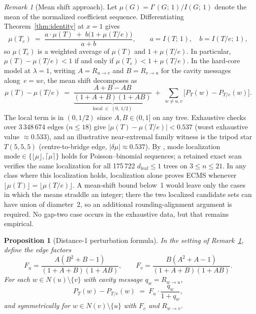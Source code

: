 \documentclass[12pt,oneside]{article}
\newtheorem{proposition}[theorem]{Proposition}
\theoremstyle{remark}
\newtheorem{remark}[theorem]{Remark}
\newcommand{\dleaf}{d_{\mathrm{leaf}}}    %
\begin{document}
\begin{remark}[Mean shift approach]\label{rem:mean-shift}
  Let $\mu(G) = I'(G;\,1)/I(G;\,1)$ denote the mean of the normalized coefficient sequence.
  Differentiating Theorem~\ref{thm:identity} at $x = 1$ gives
  \[
    \mu(T_e) \;=\; \frac{a \cdot \mu(T) \;+\; b\bigl(1 + \mu(T/e)\bigr)}{a + b},
    \qquad a = I(T;\,1),\quad b = I(T/e;\,1),
  \]
  so $\mu(T_e)$ is a weighted average of $\mu(T)$ and $1 + \mu(T/e)$.
  In particular, $\mu(T) - \mu(T/e) < 1$ if and only if $\mu(T_e) < 1 + \mu(T/e)$.
  In the hard-core model at $\lambda = 1$, writing $A = R_{u \to v}$ and $B = R_{v \to u}$ for the cavity messages along~$e = uv$, the mean shift decomposes as
  \[
    \mu(T) - \mu(T/e)
    \;=\; \underbrace{\frac{A + B - AB}{(1+A+B)(1+AB)}}_{\textstyle\text{local} \;\in\; (0,\, 1/2)}
    \;+\; \sum_{w \ne u,v} \bigl[P_T(w) - P_{T/e}(w)\bigr].
  \]
  The local term is in $(0, 1/2)$ since $A, B \in (0, 1]$ on any tree.
  Exhaustive checks over 3\,348\,674 edges ($n \le 18$) give $|\mu(T)-\mu(T/e)| < 0.537$ (worst exhaustive value $\approx 0.533$), and an illustrative near-extremal family witness is the tripod star $T(5,5,5)$ (centre-to-bridge edge, $|\delta\mu| \approx 0.537$).
  By \textcite{darroch1964}, mode localization $\mathrm{mode}\in\{\lfloor\mu\rfloor,\lceil\mu\rceil\}$ holds for Poisson--binomial sequences; a retained exact scan verifies the same localization for all 175\,722 $\dleaf\le1$ trees on $3\le n\le21$.
  In any class where this localization holds, localization alone proves ECMS whenever $\lfloor\mu(T)\rfloor=\lfloor\mu(T/e)\rfloor$.
  A mean-shift bound below~1 would leave only the cases in which the means straddle an integer; there the two localized candidate sets can have union of diameter~2, so an additional rounding-alignment argument is required.
  No gap-two case occurs in the exhaustive data, but that remains empirical.
\end{remark}

\begin{proposition}[Distance-1 perturbation formula]\label{prop:s1-formula}
  In the setting of Remark~\textup{\ref{rem:mean-shift}}, define the edge factors
  \[
    F_u = \frac{A(B^2 + B - 1)}{(1+A+B)(1+AB)}, \qquad
    F_v = \frac{B(A^2 + A - 1)}{(1+A+B)(1+AB)}.
  \]
  For each $w \in N(u) \setminus \{v\}$ with cavity message $q_w = R_{w \to u}$,
  \[
    P_T(w) - P_{T/e}(w) \;=\; F_u \cdot \frac{q_w}{1 + q_w},
  \]
  and symmetrically for $w \in N(v) \setminus \{u\}$ with $F_v$ and $R_{w \to v}$.
\end{proposition}
\end{document}
